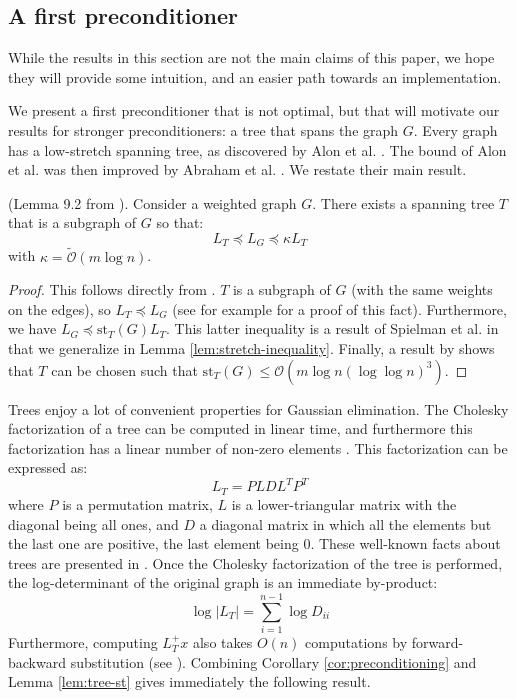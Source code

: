 

\subsection{A first preconditioner\label{sec:A-first-preconditioner}}

While the results in this section are not the main claims of this
paper, we hope they will provide some intuition, and an easier path
towards an implementation.

We present a first preconditioner that is not optimal, but that will
motivate our results for stronger preconditioners: a tree that spans
the graph $G$. Every graph has a low-stretch spanning tree, as discovered
by Alon et al. \cite{Alon1995}. The bound of Alon et al. was then
improved by Abraham et al. \cite{Abraham2008}. We restate their main
result.

\begin{lemma}(Lemma 9.2 from \cite{Spielman2009a}). Consider a weighted
graph $G$. There exists a spanning tree $T$ that is a subgraph of
$G$ so that: 
\[
L_{T}\preceq L_{G}\preceq\kappa L_{T}
\]
with $\kappa=\tilde{\mathcal{O}}\left(m\log n\right)$. %
\label{lem:tree-st} \end{lemma}

\begin{proof} 


This follows directly from \cite{Spielman2009a}. $T$ is a subgraph
of $G$ (with the same weights on the edges), so $L_{T}\preceq L_{G}$
(see \cite{Spielman2009a} for example for a proof of this fact).
Furthermore, we have $L_{G}\preceq\text{st}_{T}\left(G\right)L_{T}$.
This latter inequality is a result of Spielman et al. in \cite{Spielman2010}
that we generalize in Lemma \ref{lem:stretch-inequality}. Finally,
a result by \cite{Abraham2008} shows that $T$ can be chosen such
that $\text{st}_{T}\left(G\right)\leq\mathcal{O}(m\log n(\log\log n)^{3})$.\end{proof}

Trees enjoy a lot of convenient properties for Gaussian elimination.
The Cholesky factorization of a tree can be computed in linear time,
and furthermore this factorization has a linear number of non-zero
elements \cite{Spielman2009a}. This factorization can be expressed
as: 
\[
L_{T}=PLDL^{T}P^{T}
\]
where $P$ is a permutation matrix, $L$ is a lower-triangular matrix
with the diagonal being all ones, and $D$ a diagonal matrix in which
all the elements but the last one are positive, the last element being
$0$. These well-known facts about trees are presented in \cite{Spielman2009a}.
Once the Cholesky factorization of the tree is performed, the log-determinant
of the original graph is an immediate by-product: 
\[
\log\left|L_{T}\right|=\sum_{i=1}^{n-1}\log D_{ii}
\]
Furthermore, computing $L_{T}^{+}x$ also takes $O\left(n\right)$
computations by forward-backward substitution (see \cite{duff1986direct}).
Combining Corollary \ref{cor:preconditioning} and Lemma \eqref{lem:tree-st}
gives immediately the following result.

